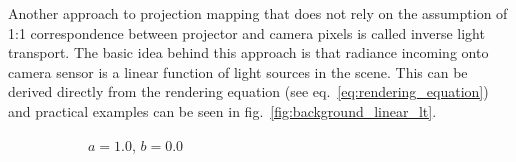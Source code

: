 Another approach to projection mapping that does not rely on the assumption of 1:1 correspondence between projector and camera pixels is called inverse light transport. The basic idea behind this approach is that radiance incoming onto camera sensor is a linear function of light sources in the scene. This can be derived directly from the rendering equation (see eq.~\ref{eq:rendering_equation}) and practical examples can be seen in fig.~\ref{fig:background_linear_lt}.

\begin{figure}[ht]
    \centering
    \begin{subfigure}[b]{0.24\textwidth}
        \centering
        \caption*{\(a = 1.0\), \(b = 0.0\)}
    \end{subfigure}
    \hfill
    \begin{subfigure}[b]{0.24\textwidth}
        \centering
        \begin{tikzpicture}

\end{tikzpicture}
\end{subfigure}
\end{figure}
